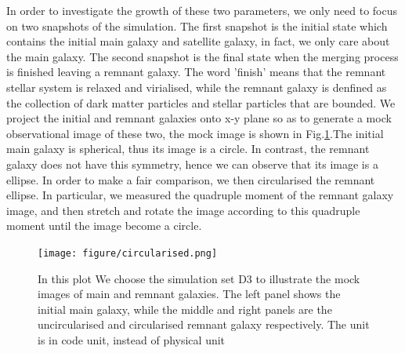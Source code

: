 \documentclass[fleqn,usenatbib]{mnras}
\begin{document}
In order to investigate the growth of these two parameters, we only need to focus on two snapshots of the simulation. The first snapshot is the initial state which contains the initial main galaxy and satellite galaxy, in fact, we only care about the main galaxy. The second snapshot is the final state when the merging process is finished leaving a remnant galaxy. The word 'finish' means that the remnant stellar system is relaxed and virialised, while the remnant galaxy is denfined as the collection of dark matter particles and stellar particles that are bounded. We project the initial and remnant galaxies onto x-y plane so as to generate a mock observational image of these two, the mock image is shown in Fig.\ref{fig:mock_image}.The initial main galaxy is spherical, thus its image is a circle. In contrast, the remnant galaxy does not have this symmetry, hence we can observe that its image is a ellipse. In order to make a fair comparison, we then circularised the remnant ellipse. In particular, we measured the quadruple moment of the remnant galaxy image, and then stretch and rotate the image according to this quadruple moment until the image become a circle.
\begin{figure}
    \centering
    \texttt{[image: figure/circularised.png]}
    \caption{\label{fig:mock_image}In this plot We choose the simulation set D3 to illustrate the mock images of main and remnant galaxies. The left panel shows the  initial main galaxy, while the middle and right panels are  the uncircularised and circularised remnant galaxy respectively. The unit is in code unit, instead of physical unit}
\end{figure}
\end{document}
